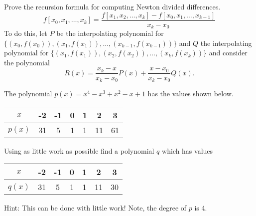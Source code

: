 \documentclass[addpoints, 11pt]{exam}
\begin{document}
\begin{questions}


\question Prove the recursion formula for computing Newton divided differences.
$$
f[x_0,x_1,\dots,x_k] = \frac{f[x_1,x_2,\dots,x_k]-f[x_0,x_1,\dots,x_{k-1}]}{x_k-x_0}
$$
To do this, let $P$ be the interpolating polynomial for $\{(x_0, f(x_0)), (x_1, f(x_1)), \dots, (x_{k-1}, f(x_{k-1})) \}$ and $Q$ the interpolating polynomial for  $\{(x_1, f(x_1)), (x_2, f(x_2)), \dots, (x_{k}, f(x_{k})) \}$ and consider the polynomial
$$
R(x) = \frac{x_k-x}{x_k-x_0}P(x) + \frac{x-x_0}{x_k-x_0}Q(x).
$$

\question The polynomial $p(x)=x^4-x^3+x^2-x+1$ has the values shown below.
\begin{center}
\begin{tabular}{ c||c|c|c|c|c|c }
$x$ & -2 & -1 & 0 & 1 & 2 & 3 \\ \hline
$p(x)$ & 31 & 5 & 1 & 1 & 11 & 61
\end{tabular}
\end{center}
Using as little work as possible find a polynomial $q$ which has values
\begin{center}
\begin{tabular}{ c||c|c|c|c|c|c }
$x$ & -2 & -1 & 0 & 1 & 2 & 3 \\ \hline
$q(x)$ & 31 & 5 & 1 & 1 & 11 & 30
\end{tabular}
\end{center}
Hint: This can be done with little work! Note, the degree of $p$ is 4.


\end{questions}
\end{document}

